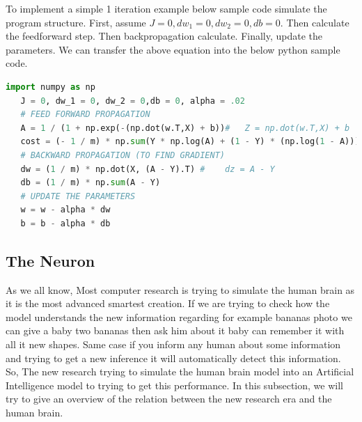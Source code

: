 To implement a simple 1 iteration example below sample code simulate the program structure. First,  assume $J = 0, dw_1 = 0, dw_2 = 0,db = 0$. Then calculate the feedforward step. Then backpropagation calculate. Finally, update the parameters. We can transfer the above equation into the below python sample code.%
 \begin{lstlisting}[language=Python]
   import numpy as np
   J = 0, dw_1 = 0, dw_2 = 0,db = 0, alpha = .02
   # FEED FORWARD PROPAGATION
   A = 1 / (1 + np.exp(-(np.dot(w.T,X) + b))#   Z = np.dot(w.T,X) + b
   cost = (- 1 / m) * np.sum(Y * np.log(A) + (1 - Y) * (np.log(1 - A)))
   # BACKWARD PROPAGATION (TO FIND GRADIENT)
   dw = (1 / m) * np.dot(X, (A - Y).T) #    dz = A - Y
   db = (1 / m) * np.sum(A - Y)
   # UPDATE THE PARAMETERS
   w = w - alpha * dw
   b = b - alpha * db
 \end{lstlisting}%
 \subsection{The Neuron}
 As we all know, Most computer research is trying to simulate the human brain as it is the most advanced smartest creation. If we are trying to check how the model understands the new information regarding for example bananas photo we can give a baby two bananas then ask him about it baby can remember it with all it new shapes. Same case if you inform any human about some information and trying to get a new inference it will automatically detect this information. So, The new research trying to simulate the human brain model into an Artificial Intelligence model to trying to get this performance. In this subsection, we will try to give an overview of the relation between the new research era and the human brain.
 
